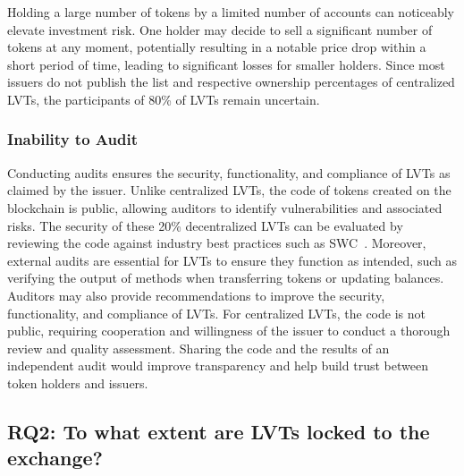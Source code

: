 Holding a large number of tokens by a limited number of accounts can noticeably elevate investment risk. One holder may decide to sell a significant number of tokens at any moment, potentially resulting in a notable price drop within a short period of time, leading to significant losses for smaller holders. Since most issuers do not publish the list and respective ownership percentages of centralized LVTs, the participants of 80\% of LVTs remain uncertain.

\subsubsection{Inability to Audit}\label{sec:audit}
Conducting audits ensures the security, functionality, and compliance of LVTs as claimed by the issuer. Unlike centralized LVTs, the code of tokens created on the blockchain is public, allowing auditors to identify vulnerabilities and associated risks. The security of these 20\% decentralized LVTs can be evaluated by reviewing the code against industry best practices such as SWC~\cite{SWC}. Moreover, external audits are essential for LVTs to ensure they function as intended, such as verifying the output of methods when transferring tokens or updating balances. Auditors may also provide recommendations to improve the security, functionality, and compliance of LVTs. For centralized LVTs, the code is not public, requiring cooperation and willingness of the issuer to conduct a thorough review and quality assessment. Sharing the code and the results of an independent audit would improve transparency and help build trust between token holders and issuers.

\subsection*{RQ2: To what extent are LVTs locked to the exchange?}\label{subsec:exchange}

